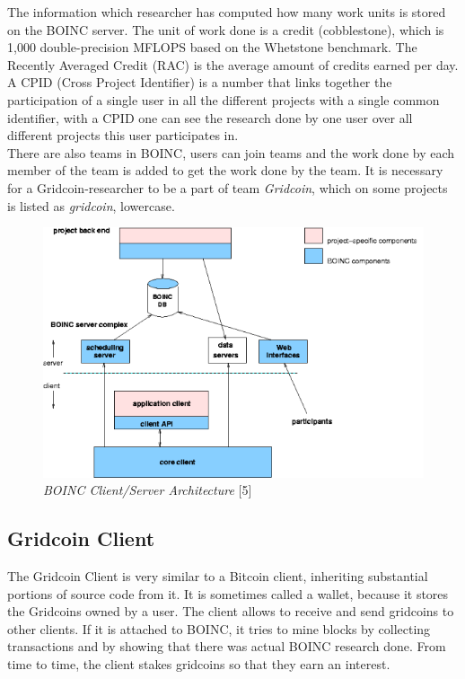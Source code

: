 The information which researcher has computed how many work units is stored on the BOINC server. The unit of work done is a credit (cobblestone), which is 1,000 double-precision MFLOPS based on the Whetstone benchmark.  The Recently Averaged Credit (RAC) is the average amount of credits earned per day.\\

A CPID (Cross Project Identifier) is a number that links together the participation of a single user in all the different projects with a single common identifier, with a CPID one can see the research done by one user over all different projects this user participates in.\\

There are also teams in BOINC, users can join teams and the work done by each member of the team is added to get the work done by the team. It is necessary for a Gridcoin-researcher to be a part of team \textit{Gridcoin}, which on some projects is listed as \textit{gridcoin}, lowercase.

\begin{figure}
\centering
\includegraphics{figures/project_boinc}
\medskip
\caption{\textit{BOINC Client/Server Architecture} [5]}
\small
\end{figure}

\subsection{Gridcoin Client}

The Gridcoin Client is very similar to a Bitcoin client, inheriting substantial portions of source code from it. It is sometimes called a wallet, because it stores the Gridcoins owned by a user. The client allows to receive and send gridcoins to other clients. If it is attached to BOINC, it tries to mine blocks by collecting transactions and by showing that there was actual BOINC research done. From time to time, the client stakes gridcoins so that they earn an interest.

